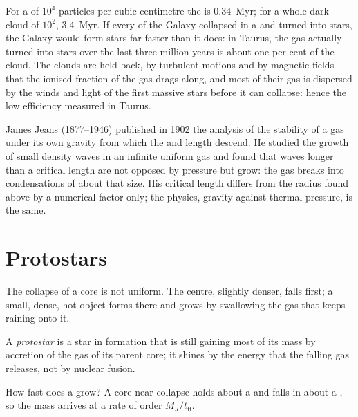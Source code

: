 For a  of $10^4$ particles per cubic centimetre the 
is \qty{0.34}{Myr}; for a whole dark cloud of $10^2$, \qty{3.4}{Myr}. If every
 of the Galaxy collapsed in a  and turned into
stars, the Galaxy would form stars far faster than it does: in Taurus, the gas actually turned
into stars over the last three million years is about one per cent of the cloud. The
clouds are held back, by turbulent motions and by magnetic fields that the
ionised fraction of the gas drags along, and most of their gas is dispersed by
the winds and light of the first massive stars before it can collapse: hence
the low efficiency measured in Taurus.

\begin{history}
James Jeans (1877--1946) published in 1902 the analysis of the stability of a
gas under its own gravity from which the  and length descend. He
studied the growth of small density waves in an infinite uniform gas and
found that waves longer than a critical length are not opposed by pressure
but grow: the gas breaks into condensations of about that size. His critical
length differs from the radius found above by a numerical factor only; the
physics, gravity against thermal pressure, is the same.
\end{history}

\section{Protostars}

The collapse of a core is not uniform. The centre, slightly denser, falls
first; a small, dense, hot object forms there and grows by swallowing the gas
that keeps raining onto it.

\begin{definition}[Protostar]\label{def:b2:ism-star-formation:protostar}
A \emph{protostar} is a star in formation that is still
gaining most of its mass by accretion of the gas of its parent core; it
shines by the energy that the falling gas releases, not by nuclear fusion.
\end{definition}

How fast does a  grow? A core near collapse holds about a 
and falls in about a , so the mass arrives at a rate of order
$M_J/t_{\mathrm{ff}}$.

